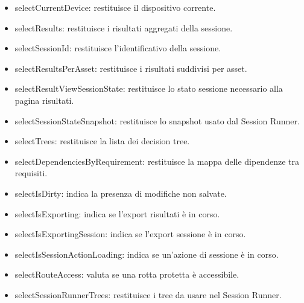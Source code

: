 \documentclass[a4paper,12pt]{article}
\begin{document}
                    \begin{itemize}
                        \item {\ttfamily selectCurrentDevice}: restituisce il dispositivo corrente.
                        \item {\ttfamily selectResults}: restituisce i risultati aggregati della sessione.
                        \item {\ttfamily selectSessionId}: restituisce l'identificativo della sessione.
                        \item {\ttfamily selectResultsPerAsset}: restituisce i risultati suddivisi per asset.
                        \item {\ttfamily selectResultViewSessionState}: restituisce lo stato sessione necessario alla pagina risultati.
                        \item {\ttfamily selectSessionStateSnapshot}: restituisce lo snapshot usato dal Session Runner.
                        \item {\ttfamily selectTrees}: restituisce la lista dei decision tree.
                        \item {\ttfamily selectDependenciesByRequirement}: restituisce la mappa delle dipendenze tra requisiti.
                        \item {\ttfamily selectIsDirty}: indica la presenza di modifiche non salvate.
                        \item {\ttfamily selectIsExporting}: indica se l'export risultati è in corso.
                        \item {\ttfamily selectIsExportingSession}: indica se l'export sessione è in corso.
                        \item {\ttfamily selectIsSessionActionLoading}: indica se un'azione di sessione è in corso.
                        \item {\ttfamily selectRouteAccess}: valuta se una rotta protetta è accessibile.
                        \item {\ttfamily selectSessionRunnerTrees}: restituisce i tree da usare nel Session Runner.
                    \end{itemize}
\end{document}
